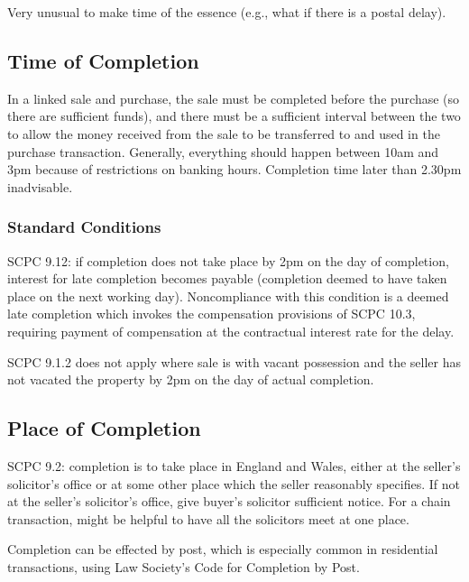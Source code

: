 \documentclass[
]{article}
\begin{document}
Very unusual to make time of the essence (e.g., what if there is a
postal delay).

\hypertarget{time-of-completion}{%
\subsection{Time of Completion}\label{time-of-completion}}

In a linked sale and purchase, the sale must be completed before the
purchase (so there are sufficient funds), and there must be a sufficient
interval between the two to allow the money received from the sale to be
transferred to and used in the purchase transaction. Generally,
everything should happen between 10am and 3pm because of restrictions on
banking hours. Completion time later than 2.30pm inadvisable.

\hypertarget{standard-conditions-1}{%
\subsubsection{Standard Conditions}\label{standard-conditions-1}}

SCPC 9.12: if completion does not take place by 2pm on the day of
completion, interest for late completion becomes payable (completion
deemed to have taken place on the next working day). Noncompliance with
this condition is a deemed late completion which invokes the
compensation provisions of SCPC 10.3, requiring payment of compensation
at the contractual interest rate for the delay.

SCPC 9.1.2 does not apply where sale is with vacant possession and the
seller has not vacated the property by 2pm on the day of actual
completion.

\hypertarget{place-of-completion}{%
\subsection{Place of Completion}\label{place-of-completion}}

SCPC 9.2: completion is to take place in England and Wales, either at
the seller's solicitor's office or at some other place which the seller
reasonably specifies. If not at the seller's solicitor's office, give
buyer's solicitor sufficient notice. For a chain transaction, might be
helpful to have all the solicitors meet at one place.

Completion can be effected by post, which is especially common in
residential transactions, using Law Society's Code for Completion by
Post.
\end{document}
